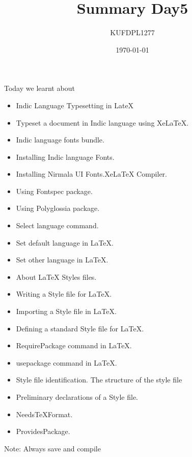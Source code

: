 \documentclass[12pt,a4paper]{article}
\title{Summary Day5}
\author{KUFDPL1277}
\date{\today}
\begin{document}
\maketitle
Today we learnt about
\begin{itemize}
\item Indic Language Typesetting in LateX
\item Typeset a document in Indic language using XeLaTeX.
\item Indic language fonts bundle.
\item Installing Indic language Fonts.
\item Installing Nirmala UI Fonts.XeLaTeX Compiler.
\item Using Fontspec package.
\item Using Polyglossia package.
\item Select language command.
\item Set default language in LaTeX.
\item Set other language in LaTeX.
\item About LaTeX Styles files.
\item Writing a Style file for LaTeX.
\item Importing a Style file in LaTeX.
\item Defining a standard Style file for LaTeX.
\item RequirePackage command in LaTeX.
\item usepackage command in LaTeX.
\item Style file identification. The structure of the style file
\item Preliminary declarations of a Style file.
\item NeedsTeXFormat.
\item ProvidesPackage.
\end{itemize}

Note: Always save and compile
\end{document}
